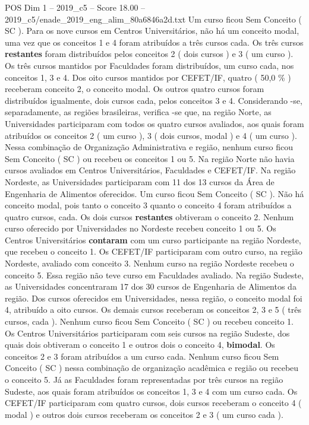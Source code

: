 \begin{textsample}{POS Dim 1 – 2019\_c5 – Score 18.00 – 2019\_c5/enade\_2019\_eng\_alim\_80a6846a2d.txt}
Um curso ficou Sem Conceito ( SC ).
Para os nove cursos em Centros Universitários, não há um conceito modal, uma vez que os conceitos 1 e 4 foram atribuídos a três cursos cada.
Os três cursos \textbf{restantes} foram distribuídos pelos conceitos 2 ( dois cursos ) e 3 ( um curso ).
Os três cursos mantidos por Faculdades foram distribuídos, um curso cada, nos conceitos 1, 3 e 4.
Dos oito cursos mantidos por CEFET/IF, quatro ( 50,0 \% ) receberam conceito 2, o conceito modal.
Os outros quatro cursos foram distribuídos igualmente, dois cursos cada, pelos conceitos 3 e 4.
Considerando -se, separadamente, as regiões brasileiras, verifica -se que, na região Norte, as Universidades participaram com todos os quatro cursos avaliados, aos quais foram atribuídos os conceitos 2 ( um curso ), 3 ( dois cursos, modal ) e 4 ( um curso ).
Nessa combinação de Organização Administrativa e região, nenhum curso ficou Sem Conceito ( SC ) ou recebeu os conceitos 1 ou 5.
Na região Norte não havia cursos avaliados em Centros Universitários, Faculdades e CEFET/IF.
Na região Nordeste, as Universidades participaram com 11 dos 13 cursos da Área de Engenharia de Alimentos oferecidos.
Um curso ficou Sem Conceito ( SC ).
Não há conceito modal, pois tanto o conceito 3 quanto o conceito 4 foram atribuídos a quatro cursos, cada.
Os dois cursos \textbf{restantes} obtiveram o conceito 2.
Nenhum curso oferecido por Universidades no Nordeste recebeu conceito 1 ou 5.
Os Centros Universitários \textbf{contaram} com um curso participante na região Nordeste, que recebeu o conceito 1.
Os CEFET/IF participaram com outro curso, na região Nordeste, avaliado com conceito 3.
Nenhum curso na região Nordeste recebeu o conceito 5.
Essa região não teve curso em Faculdades avaliado.
Na região Sudeste, as Universidades concentraram 17 dos 30 cursos de Engenharia de Alimentos da região.
Dos cursos oferecidos em Universidades, nessa região, o conceito modal foi 4, atribuído a oito cursos.
Os demais cursos receberam os conceitos 2, 3 e 5 ( três cursos, cada ).
Nenhum curso ficou Sem Conceito ( SC ) ou recebeu conceito 1.
Os Centros Universitários participaram com seis cursos na região Sudeste, dos quais dois obtiveram o conceito 1 e outros dois o conceito 4, \textbf{bimodal}.
Os conceitos 2 e 3 foram atribuídos a um curso cada.
Nenhum curso ficou Sem Conceito ( SC ) nessa combinação de organização acadêmica e região ou recebeu o conceito 5.
Já as Faculdades foram representadas por três cursos na região Sudeste, aos quais foram atribuídos os conceitos 1, 3 e 4 com um curso cada.
Os CEFET/IF participaram com quatro cursos, dois cursos receberam o conceito 4 ( modal ) e outros dois cursos receberam os conceitos 2 e 3 ( um curso cada ).

\end{textsample}
